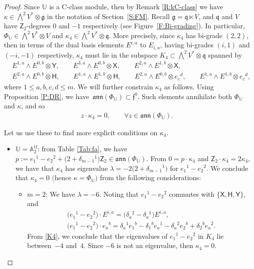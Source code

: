 \documentclass[10pt,a4paper]{amsart}
\newcommand\tensor{\otimes}
\DeclareMathOperator{\tf}{tf}
\newcommand\fann{\mathfrak{ann}}
\newcommand\ff{\mathfrak{f}}
\newcommand\fg{\mathfrak{g}}
\newcommand\fq {\mathfrak{q}}
\newcommand\bbU{\mathbb{U}}
\newcommand\bbA{\mathbb{A}}
\newcommand\sfX{\mathsf{X}}
\newcommand\sfH{\mathsf{H}}
\newcommand\sfY{\mathsf{Y}}
\newcommand\sfZ{\mathsf{Z}}
\numberwithin{equation}{section}
\begin{document}
\begin{proof}
Since $\bbU$ is a C-class module, then by Remark \ref{R:kC-class} we have $\kappa \in \bigwedge^2 V^* \otimes \fg$ in the notation of Section~\ref{S:FM}. Recall $\fg = \fq \ltimes V$, and $\fq$ and $V$ have $\sfZ_2$-degrees $0$ and $-1$ respectively (see Figure~\ref{F:Bi-grading}). In particular, $\Phi_\bbU \in \bigwedge^2 V^\ast\tensor V$ and $\kappa_4 \in \bigwedge^2 V^\ast \tensor \fq$. More precisely, since $\kappa_4$ has bi-grade $(2,2)$, then in terms of the dual basis elements $E^{i,a}$ to $E_{i,a}$, having bi-grades $(i,1)$ and $(-i,-1)$ respectively, $\kappa_4$ must lie in the subspace $K_4 \subset \bigwedge^2 V^\ast \tensor \fq$ spanned by
\begin{align}
& E^{1,a} \wedge E^{0,b} \tensor \sfY, \qquad E^{3,a} \wedge E^{0,b} \tensor \sfX, \qquad E^{2,a} \wedge E^{1,b} \tensor \sfX,\nonumber\\
& E^{2,a} \wedge E^{0,b} \tensor \sfH, \qquad E^{1,a} \wedge E^{1,b} \tensor \sfH, \qquad E^{2,a} \wedge E^{0,b} \tensor e_c{}^d, \qquad E^{1,a} \wedge E^{1,b} \tensor e_c{}^d,\label{K4}
\end{align}
where $1 \le a, b,c,d \le m$. We will further constrain $\kappa_4$ as follows. Using Proposition \ref{P:DR}, we have~$\fann(\Phi_\bbU) \subset \ff^0$. Such elements annihilate both $\Phi_\bbU$ and $\kappa$, and so
\begin{align*}%
z \cdot \kappa_4 = 0, \qquad \forall z \in \fann(\Phi_\bbU).
\end{align*}
	
Let us use these to find more explicit conditions on $\kappa_4$.
\begin{itemize}\itemsep=0pt
\item [(1)] $\bbU = \bbA_2^{\tf}$: from Table {\rm \ref{Tab:fa}}, we have $p:=e_1{}^1 - e_2{}^2 + \bigl(2 + \delta_{m-1}{}^1\bigr)\sfZ_2 \in \fann(\Phi_\bbU)$. From $0 = p\cdot \kappa_4$ and $\sfZ_2 \cdot \kappa_4 = 2\kappa_4$, we have that $\kappa_4$ has eigenvalue $\lambda = -2\bigl(2 + \delta_{m-1}{}^1\bigr)$ for $e_1{}^1 - e_2{}^2$. We conclude that $\kappa_4 = 0$ $($hence $\kappa = \Phi_\bbU)$ from the following considerations:
\begin{itemize}\itemsep=0pt
\item[$(i)$] $m=2$: We have $\lambda = -6$. Noting that $e_1{}^1 - e_2{}^2$ commutes with $\{\sfX, \sfH, \sfY\}$, and
\begin{align*}%
&\bigl(e_1{}^1 - e_2{}^2\bigr)\cdot E^{i,a} = \bigl(\delta_a{}^2-\delta_a{}^1\bigr)E^{i,a}, \\
&\bigl(e_1{}^1 - e_2{}^2\bigr)\cdot e_a{}^b = \delta_a{}^1e_1{}^b-\delta_1{}^b e_a{}^1-\delta_a{}^2e_2{}^b + \delta_2{}^b e_a{}^2.
\end{align*}
From \eqref{K4}, we conclude that the eigenvalues of $e_1{}^1 - e_2{}^2$ in $K_4$ lie between~$-4$ and~$4$. Since $-6$ is not an eigenvalue, then $\kappa_4 = 0$.
			

\end{itemize}
\end{itemize}
\end{proof}
\end{document}
